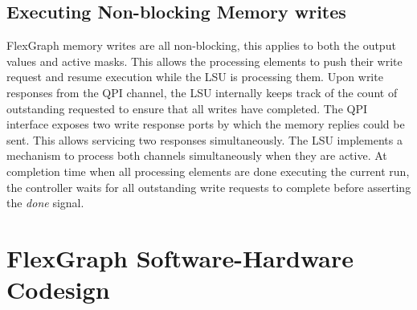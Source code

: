 \subsection{Executing Non-blocking Memory writes}

FlexGraph memory writes are all non-blocking, this applies to both the output values and active masks. This allows the processing elements to push their write request and resume execution while the LSU is processing them. Upon write responses from the QPI channel, the LSU internally keeps track of the count of outstanding requested to ensure that all writes have completed. The QPI interface exposes two write response ports by which the memory replies could be sent. This allows servicing two responses simultaneously. The LSU implements a mechanism to process both channels simultaneously when they are active. At completion time when all processing elements are done executing the current run, the controller waits for all outstanding write requests to complete before asserting the \textit{done} signal.

\section{FlexGraph Software-Hardware Codesign}